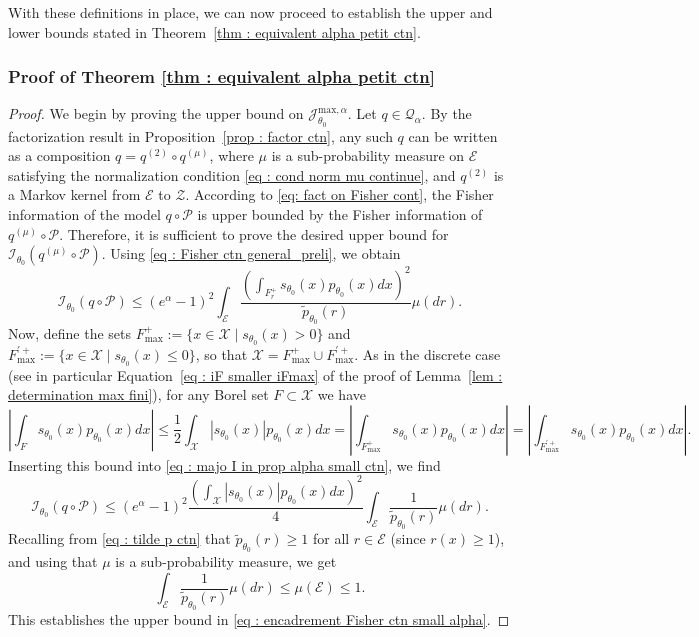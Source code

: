 \documentclass[a4paper, 11pt]{article}
\theoremstyle{definition}
\newcommand{\cE}{{\mathcal{E}}}
\newcommand{\cI}{{\mathcal{I}}}
\newcommand{\cJ}{{\mathcal{J}}}
\newcommand{\cP}{{\mathcal{P}}}
\newcommand{\cQ}{{\mathcal{Q}}}
\newcommand{\cZ}{{\mathcal{Z}}}
\begin{document}
{With these definitions in place, we can now proceed to establish the upper and lower bounds stated in Theorem~\ref{thm : equivalent alpha petit ctn}.


 \subsubsection{Proof of Theorem \ref{thm : equivalent alpha petit ctn}}
 \begin{proof}
We begin by proving the upper bound on $\cJ^{\text{max},\alpha}_{\theta_0}$. Let $q \in \cQ_\alpha$. By the factorization result in Proposition~\ref{prop : factor ctn}, any such $q$ can be written as a composition $q = q^{(2)} \circ q^{(\mu)}$, where $\mu$ is a sub-probability measure on $\cE$ satisfying the normalization condition \eqref{eq : cond norm mu continue}, and $q^{(2)}$ is a Markov kernel from $\cE$ to $\cZ$. According to \eqref{eq: fact on Fisher cont}, the Fisher information of the model $q \circ \cP$ is upper bounded by the Fisher information of $q^{(\mu)} \circ \cP$. Therefore, it is sufficient to prove the desired upper bound for $\cI_{\theta_0}(q^{(\mu)} \circ \cP)$. Using \eqref{eq : Fisher ctn general_preli}, we obtain
\begin{equation} \label{eq : majo I in prop alpha small ctn}
	\cI_{\theta_0}(q \circ \cP) \le (e^\alpha - 1)^2
	\int_\cE \frac{\left( \int_{F^+_r} s_{\theta_0}(x) p_{\theta_0}(x) dx \right)^2}
	{\widetilde{p}_{\theta_0}(r)} \mu(dr).
\end{equation}
Now, define the sets $F^+_{\text{max}} := \{ x \in \mathcal{X} \mid s_{\theta_0}(x) > 0 \}$ and $F^{\prime +}_{\text{max}} := \{ x \in \mathcal{X} \mid s_{\theta_0}(x) \le 0 \}$, so that $\mathcal{X} = F^+_{\text{max}} \cup F^{\prime +}_{\text{max}}$. As in the discrete case (see in particular Equation~\eqref{eq : iF smaller iFmax} of the proof of Lemma~\ref{lem :  determination max fini}), for any Borel set $F \subset \mathcal{X}$ we have
\[
\left| \int_F s_{\theta_0}(x) p_{\theta_0}(x) dx \right|
\le \frac{1}{2} \int_{\mathcal{X}} |s_{\theta_0}(x)| p_{\theta_0}(x) dx
= \left| \int_{F^+_{\text{max}}} s_{\theta_0}(x) p_{\theta_0}(x) dx \right|
= \left| \int_{F^{\prime +}_{\text{max}}} s_{\theta_0}(x) p_{\theta_0}(x) dx \right|.
\]
Inserting this bound into \eqref{eq : majo I in prop alpha small ctn}, we find
\begin{equation*}
	\cI_{\theta_0}(q \circ \cP) \le
	(e^\alpha - 1)^2
	\frac{ \left( \int_{\mathcal{X}} |s_{\theta_0}(x)| p_{\theta_0}(x) dx \right)^2 }{4}
	\int_\cE \frac{1}{\widetilde{p}_{\theta_0}(r)} \mu(dr).
\end{equation*}
Recalling from \eqref{eq : tilde p ctn} that $\widetilde{p}_{\theta_0}(r) \ge 1$ for all $r \in \cE$ (since $r(x) \ge 1$), and using that $\mu$ is a sub-probability measure, we get
\[
\int_\cE \frac{1}{\widetilde{p}_{\theta_0}(r)} \mu(dr) \le \mu(\cE) \le 1.
\]
This establishes the upper bound in \eqref{eq :  encadrement Fisher ctn small alpha}.


\end{proof}}
\end{document}
